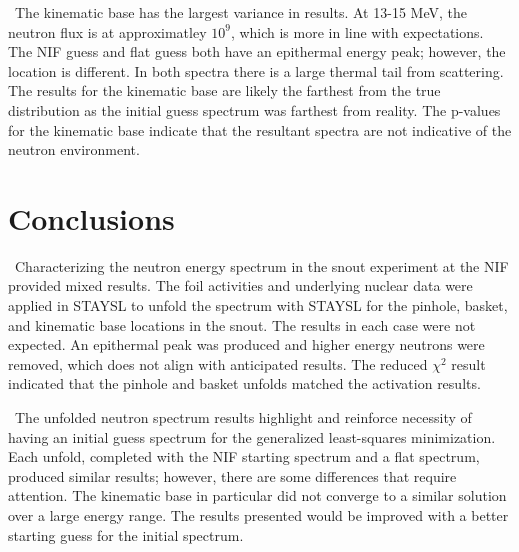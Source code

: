 \documentclass[journal]{IEEEtran}
\begin{document}
	\ The kinematic base has the largest variance in results. 
At 13-15 MeV, the neutron flux is at approximatley $10^{9}$, which is more in line with expectations. 
The NIF guess and flat guess both have an epithermal energy peak; however, the location is different. 
In both spectra there is a large thermal tail from scattering. 
The results for the kinematic base are likely the farthest from the true distribution as the initial guess spectrum was farthest from reality. 
The p-values for the kinematic base indicate that the resultant spectra are not indicative of the neutron environment. 
	 
	\section{Conclusions}
	
	\ Characterizing the neutron energy spectrum in the snout experiment at the NIF provided mixed results. 
The foil activities and underlying nuclear data were applied in STAYSL to unfold the spectrum with STAYSL for the pinhole, basket, and kinematic base locations in the snout. 
The results in each case were not expected. 
An epithermal peak was produced and higher energy neutrons were removed, which does not align with anticipated results. 
The reduced $\chi^{2}$  result indicated that the pinhole and basket unfolds matched the activation results. 
	
	\ The unfolded neutron spectrum results highlight and reinforce necessity of having an initial guess spectrum for the generalized least-squares minimization. 
Each unfold, completed with the NIF starting spectrum and a flat spectrum, produced similar results; however, there are some differences that require attention. 
The kinematic base in particular did not converge to a similar solution over a large energy range. 
The results presented would be improved with a better starting guess for the initial spectrum. 

	\ifCLASSOPTIONcaptionsoff
	\newpage
	\fi
	
\end{document}
